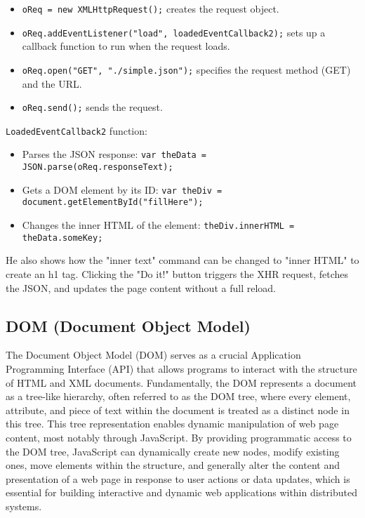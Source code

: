 \begin{itemize}[noitemsep, topsep=4pt]
        \item \verb|oReq = new XMLHttpRequest();| creates the request object.
        \item \verb|oReq.addEventListener("load", loadedEventCallback2);| sets up a callback function to run when the request loads.
        \item \verb|oReq.open("GET", "./simple.json");| specifies the request method (GET) and the URL.
        \item \verb|oReq.send();| sends the request.
\end{itemize}
\texttt{\large{LoadedEventCallback2}} function:
\begin{itemize}[noitemsep, topsep=4pt]
        \item Parses the JSON response: \verb|var theData = JSON.parse(oReq.responseText);|
        \item Gets a DOM element by its ID: \verb|var theDiv = document.getElementById("fillHere");|
        \item Changes the inner HTML of the element: \verb|theDiv.innerHTML = theData.someKey;|
\end{itemize}
He also shows how the "inner text" command can be changed to "inner HTML" to create an h1 tag.
 Clicking the "Do it!" button triggers the XHR request, fetches the JSON, and updates the page content without a full reload.

\subsection{DOM (Document Object Model)}
The Document Object Model (DOM) serves as a crucial Application Programming Interface (API) that allows programs to interact with the structure of HTML and XML documents.  Fundamentally, the DOM represents a document as a tree-like hierarchy, often referred to as the DOM tree, where every element, attribute, and piece of text within the document is treated as a distinct node in this tree.  This tree representation enables dynamic manipulation of web page content, most notably through JavaScript.  By providing programmatic access to the DOM tree, JavaScript can dynamically create new nodes, modify existing ones, move elements within the structure, and generally alter the content and presentation of a web page in response to user actions or data updates, which is essential for building interactive and dynamic web applications within distributed systems.


